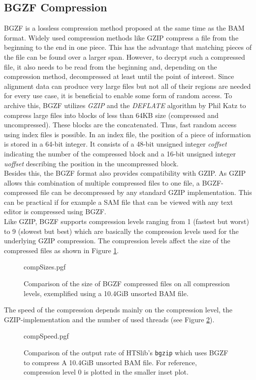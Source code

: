 \subsection{BGZF Compression}
BGZF is a lossless compression method proposed at the same time as the BAM format. Widely used compression methods like GZIP compress a file from the beginning to the end in one piece. This has the advantage that matching pieces of the file can be found over a larger span. However, to decrypt such a compressed file, it also needs to be read from the beginning and, depending on the compression method, decompressed at least until the point of interest. Since alignment data can produce very large files but not all of their regions are needed for every use case, it is beneficial to enable some form of random access. To archive this, BGZF utilizes \textit{GZIP} \cite{gzip} and the \textit{DEFLATE} algorithm \cite{deflate} by Phil Katz to compress large files into blocks of less than 64KB size (compressed and uncompressed). These blocks are the concatenated. Thus, fast random access using index files is possible. In an index file, the position of a piece of information is stored in a 64-bit integer. It consists of a 48-bit unsigned integer \textit{coffset} indicating the number of the compressed block and a 16-bit unsigned integer \textit{uoffset} describing the position in the uncompressed block. \\
Besides this, the BGZF format also provides compatibility with GZIP. As GZIP allows this combination of multiple compressed files to one file, a BGZF-compressed file can be decompressed by any standard GZIP implementation. This can be practical if for example a SAM file that can be viewed with any text editor is compressed using BGZF. \\
Like GZIP, BGZF supports compression levels ranging from 1 (fastest but worst) to 9 (slowest but best) which are basically the compression levels used for the underlying GZIP compression. The compression levels affect the size of the compressed files as shown in Figure \ref{fig:compSizes}.
\begin{figure}
        {compSizes.pgf}
    \caption{Comparison of the size of BGZF compressed files on all compression levels, exemplified using a 10.4GiB unsorted BAM file.}
    \label{fig:compSizes}
\end{figure}
The speed of the compression depends mainly on the compression level, the GZIP-implementation and the number of used threads (see Figure \ref{fig:compSpeed}).  
\begin{figure}
        {compSpeed.pgf}
    \caption{Comparison of the output rate of HTSlib's \texttt{bgzip} which uses BGZF to compress A 10.4GiB unsorted BAM file. For reference, compression level 0 is plotted in the smaller inset plot.}
    \label{fig:compSpeed}
\end{figure}
